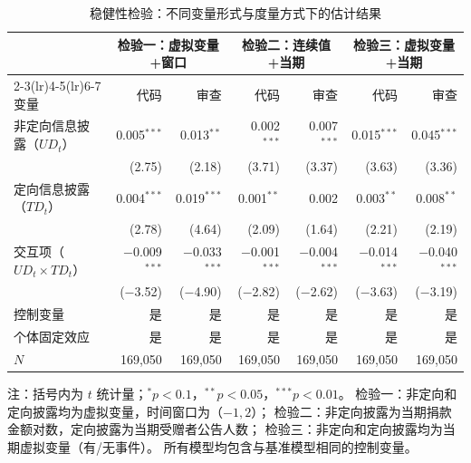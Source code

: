 \documentclass[
    type = master, %
    degree = professional,        %
    decl-page,  %
    twoside,                %
    fontset = fandol %
  ]{njuthesis}
\begin{document}
\begin{table}[htbp]
    \centering
    \caption{稳健性检验：不同变量形式与度量方式下的估计结果}
    \label{tab:robustness-all}
    \small
    \begin{tabularx}{\textwidth}{Xrrrrrr}
        \toprule
        & \multicolumn{2}{c}{检验一：虚拟变量+窗口}
        & \multicolumn{2}{c}{检验二：连续值+当期}
        & \multicolumn{2}{c}{检验三：虚拟变量+当期} \\
        \cmidrule(lr){2-3}\cmidrule(lr){4-5}\cmidrule(lr){6-7}
        变量 & 代码 & 审查 & 代码 & 审查 & 代码 & 审查 \\
        \midrule
        非定向信息披露（$UD_t$）
            & 0.005$^{***}$ & 0.013$^{**}$
            & 0.002$^{***}$ & 0.007$^{***}$
            & 0.015$^{***}$ & 0.045$^{***}$ \\
            & (2.75) & (2.18)
            & (3.71) & (3.37)
            & (3.63) & (3.36) \\[0.4em]
        定向信息披露（$TD_t$）
            & 0.004$^{***}$ & 0.019$^{***}$
            & 0.001$^{**}$ & 0.002
            & 0.003$^{**}$ & 0.008$^{**}$ \\
            & (2.78) & (4.64)
            & (2.09) & (1.64)
            & (2.21) & (2.19) \\[0.4em]
        交互项（$UD_t \times TD_t$）
            & $-$0.009$^{***}$ & $-$0.033$^{***}$
            & $-$0.001$^{***}$ & $-$0.004$^{***}$
            & $-$0.014$^{***}$ & $-$0.040$^{***}$ \\
            & ($-$3.52) & ($-$4.90)
            & ($-$2.82) & ($-$2.62)
            & ($-$3.63) & ($-$3.19) \\[0.4em]
        \midrule
        控制变量 & 是 & 是 & 是 & 是 & 是 & 是 \\
        个体固定效应 & 是 & 是 & 是 & 是 & 是 & 是 \\
        $N$ & 169,050 & 169,050 & 169,050 & 169,050 & 169,050 & 169,050 \\
        \bottomrule
    \end{tabularx}
    \begin{minipage}{\textwidth}
        \vspace{0.3em}
        \footnotesize 注：括号内为 $t$ 统计量；$^{*}p<0.1$，$^{**}p<0.05$，$^{***}p<0.01$。
        检验一：非定向和定向披露均为虚拟变量，时间窗口为（$-1, 2$）；
        检验二：非定向披露为当期捐款金额对数，定向披露为当期受赠者公告人数；
        检验三：非定向和定向披露均为当期虚拟变量（有/无事件）。
        所有模型均包含与基准模型相同的控制变量。
    \end{minipage}
\end{table}
\end{document}
